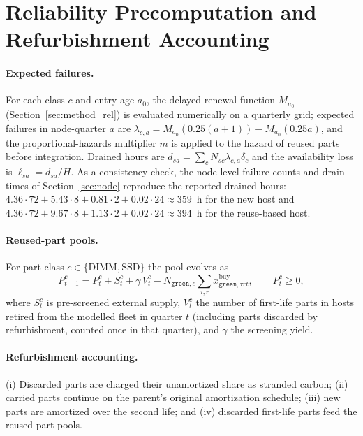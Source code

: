 \documentclass{article} %
\begin{document}
\section{Reliability Precomputation and Refurbishment Accounting}
\label{app:rel}
\paragraph{Expected failures.} For each class $c$ and entry age $a_0$, the delayed renewal function $M_{a_0}$ (Section~\ref{sec:method_rel}) is evaluated numerically on a quarterly grid; expected failures in node-quarter $a$ are $\lambda_{c,a} = M_{a_0}(0.25(a+1)) - M_{a_0}(0.25a)$, and the proportional-hazards multiplier $m$ is applied to the hazard of reused parts before integration. Drained hours are $d_{sa} = \sum_c N_{sc}\lambda_{c,a}\delta_c$ and the availability loss is $\ell_{sa} = d_{sa}/H$. As a consistency check, the node-level failure counts and drain times of Section~\ref{sec:node} reproduce the reported drained hours: $4.36\cdot 72 + 5.43\cdot 8 + 0.81\cdot 2 + 0.02\cdot 24 \approx 359$~h for the new host and $4.36\cdot 72 + 9.67\cdot 8 + 1.13\cdot 2 + 0.02\cdot 24 \approx 394$~h for the reuse-based host.

\paragraph{Reused-part pools.} For part class $c\in\{\text{DIMM}, \text{SSD}\}$ the pool evolves as
\begin{equation}
P^c_{t+1} = P^c_t + S^c_t + \gamma\, V^c_t - N_{\texttt{green},c}\sum_{\tau, r} x^{\text{buy}}_{\texttt{green},\tau r t}, \qquad P^c_t \ge 0,
\label{eq:pool}
\end{equation}
where $S^c_t$ is pre-screened external supply, $V^c_t$ the number of first-life parts in hosts retired from the modelled fleet in quarter $t$ (including parts discarded by refurbishment, counted once in that quarter), and $\gamma$ the screening yield.

\paragraph{Refurbishment accounting.} (i) Discarded parts are charged their unamortized share as stranded carbon; (ii) carried parts continue on the parent's original amortization schedule; (iii) new parts are amortized over the second life; and (iv) discarded first-life parts feed the reused-part pools.
\end{document}
